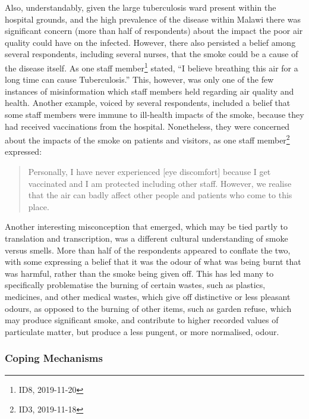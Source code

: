 \documentclass[
  authoryear,
  review,
  3p]{elsarticle}
\begin{document}
Also, understandably, given the large tuberculosis ward present within
the hospital grounds, and the high prevalence of the disease within
Malawi \citep{worldhealthorganization2019global} there was significant
concern (more than half of respondents) about the impact the poor air
quality could have on the infected. However, there also persisted a
belief among several respondents, including several nurses, that the
smoke could be a cause of the disease itself. As one staff
member\footnote{ID8, 2019-11-20} stated, ``I believe breathing this air
for a long time can cause Tuberculosis.'' This, however, was only one of
the few instances of misinformation which staff members held regarding
air quality and health. Another example, voiced by several respondents,
included a belief that some staff members were immune to ill-health
impacts of the smoke, because they had received vaccinations from the
hospital. Nonetheless, they were concerned about the impacts of the
smoke on patients and visitors, as one staff member\footnote{ID3,
  2019-11-18} expressed:

\begin{quote}
Personally, I have never experienced {[}eye discomfort{]} because I get
vaccinated and I am protected including other staff. However, we realise
that the air can badly affect other people and patients who come to this
place.
\end{quote}

Another interesting misconception that emerged, which may be tied partly
to translation and transcription, was a different cultural understanding
of smoke versus smells. More than half of the respondents appeared to
conflate the two, with some expressing a belief that it was the odour of
what was being burnt that was harmful, rather than the smoke being given
off. This has led many to specifically problematise the burning of
certain wastes, such as plastics, medicines, and other medical wastes,
which give off distinctive or less pleasant odours, as opposed to the
burning of other items, such as garden refuse, which may produce
significant smoke, and contribute to higher recorded values of
particulate matter, but produce a less pungent, or more normalised,
odour.

\hypertarget{coping-mechanisms}{%
\subsubsection{Coping Mechanisms}\label{coping-mechanisms}}
\end{document}
